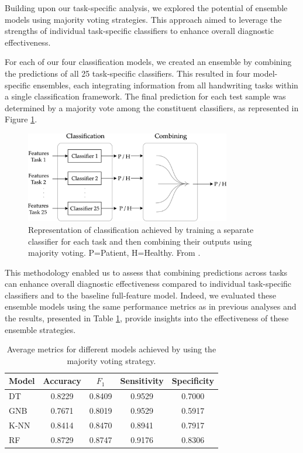 \documentclass[a4paper, 11pt]{article}
\begin{document}
Building upon our task-specific analysis, we explored the potential of ensemble models using majority voting strategies. This approach aimed to leverage the strengths of individual task-specific classifiers to enhance overall diagnostic effectiveness. 

For each of our four classification models, we created an ensemble by combining the predictions of all 25 task-specific classifiers. This resulted in four model-specific ensembles, each integrating information from all handwriting tasks within a single classification framework. The final prediction for each test sample was determined by a majority vote among the constituent classifiers, as represented in Figure \ref{fig:immagine2}. 

\begin{figure}[h!]
    \centering
    \includegraphics[width=0.8\textwidth]{Figures/immagine2.jpg}
    \caption{\footnotesize{Representation of classification achieved by training a separate classifier for each task and then combining their outputs using majority voting. P=Patient, H=Healthy. From \cite{Cilia2022}.}}
    \label{fig:immagine2}
\end{figure}

This methodology enabled us to assess that combining predictions across tasks can enhance overall diagnostic effectiveness compared to individual task-specific classifiers and to the baseline full-feature model. Indeed, we evaluated these ensemble models using the same performance metrics as in previous analyses and the results, presented in Table \ref{table:majority-voting}, provide insights into the effectiveness of these ensemble strategies.

\begin{table}[h!]
\centering
\scriptsize
\begin{tabular}{lcccc}
\toprule
\textbf{Model} & \textbf{Accuracy} & \textbf{$F_1$} & \textbf{Sensitivity} & \textbf{Specificity} \\
\midrule
DT & 0.8229 & 0.8409 & 0.9529 & 0.7000 \\
GNB & 0.7671 & 0.8019 & 0.9529 & 0.5917 \\
K-NN & 0.8414 & 0.8470 & 0.8941 & 0.7917 \\
RF & 0.8729 & 0.8747 & 0.9176 & 0.8306 \\
\bottomrule
\end{tabular}
\caption{\footnotesize Average metrics for different models achieved by using the majority voting strategy.}
\label{table:majority-voting}
\end{table}
\end{document}
